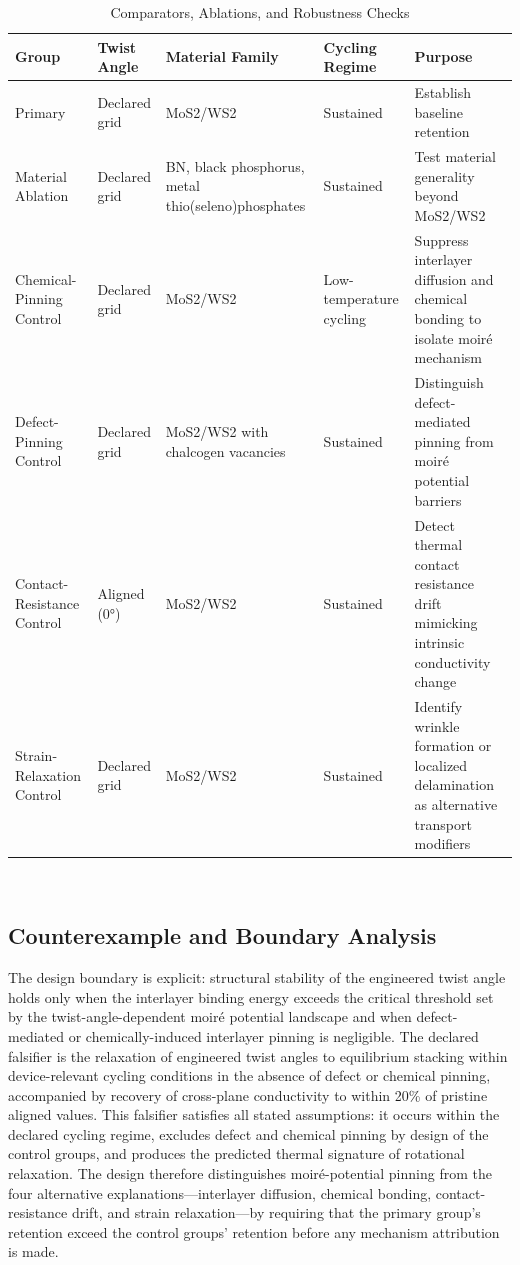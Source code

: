 \documentclass[conference]{IEEEtran}
\begin{document}
\begin{table}[htbp]
\centering
\footnotesize
\setlength{\tabcolsep}{3pt}
\renewcommand{\arraystretch}{1.12}
\caption{Comparators, Ablations, and Robustness Checks}
\label{tab:study-design-and-methods-b2-comparison}
\begin{tabular}{|p{}|p{}|p{}|p{}|p{}|}
\hline
Group & Twist Angle & Material Family & Cycling Regime & Purpose \\\hline
Primary & Declared grid & MoS2/WS2 & Sustained & Establish baseline retention \\\hline
Material Ablation & Declared grid & BN, black phosphorus, metal thio(seleno)phosphates & Sustained & Test material generality beyond MoS2/WS2 \\\hline
Chemical-Pinning Control & Declared grid & MoS2/WS2 & Low-temperature cycling & Suppress interlayer diffusion and chemical bonding to isolate moiré mechanism \\\hline
Defect-Pinning Control & Declared grid & MoS2/WS2 with chalcogen vacancies & Sustained & Distinguish defect-mediated pinning from moiré potential barriers \\\hline
Contact-Resistance Control & Aligned (0°) & MoS2/WS2 & Sustained & Detect thermal contact resistance drift mimicking intrinsic conductivity change \\\hline
Strain-Relaxation Control & Declared grid & MoS2/WS2 & Sustained & Identify wrinkle formation or localized delamination as alternative transport modifiers \\\hline
\end{tabular}
\end{table}~\cite{cite_26ecaf73d88dfe33,cite_54b9175b8bb4c4e0,cite_78dc2ce387cb7c90,cite_a411cbbebf7838b9,cite_b9cc1fcb55e94349}

\subsection{Counterexample and Boundary Analysis}
The design boundary is explicit: structural stability of the engineered twist angle holds only when the interlayer binding energy exceeds the critical threshold set by the twist-angle-dependent moiré potential landscape and when defect-mediated or chemically-induced interlayer pinning is negligible. The declared falsifier is the relaxation of engineered twist angles to equilibrium stacking within device-relevant cycling conditions in the absence of defect or chemical pinning, accompanied by recovery of cross-plane conductivity to within 20\% of pristine aligned values. This falsifier satisfies all stated assumptions: it occurs within the declared cycling regime, excludes defect and chemical pinning by design of the control groups, and produces the predicted thermal signature of rotational relaxation. The design therefore distinguishes moiré-potential pinning from the four alternative explanations—interlayer diffusion, chemical bonding, contact-resistance drift, and strain relaxation—by requiring that the primary group's retention exceed the control groups' retention before any mechanism attribution is made.~\cite{cite_26ecaf73d88dfe33}
\end{document}
